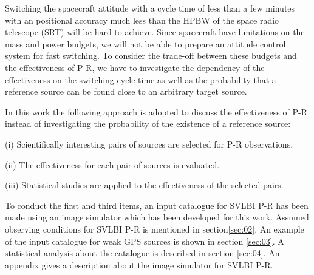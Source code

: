 Switching the spacecraft attitude with a cycle time of less 
than a few minutes with an positional accuracy much less than 
the HPBW of the space radio telescope (SRT) will be hard to 
achieve. Since spacecraft have limitations on the mass and 
power budgets, we will not be able to prepare 
an attitude control system for fast switching. To consider 
the trade-off between these budgets and 
the effectiveness of P-R, we have to investigate the 
dependency of the effectiveness on the switching cycle time 
as well as the probability that a reference source can 
be found close to an arbitrary target source.  

In this work the following approach is adopted to discuss 
the effectiveness of P-R instead of investigating the 
probability of the existence of a reference source: 
    \begin{list}{}
    {
        \setlength{\itemindent}{-6mm}
        \setlength{\parsep}{0mm}
        \setlength{\topsep}{3mm}
    }
    \item{(i)}
       Scientifically interesting pairs of sources are 
       selected for P-R observations. 
    \item{(ii)}
       The effectiveness for each pair of sources is evaluated. 
    \item{(iii)}
       Statistical studies are applied to the effectiveness of 
       the selected pairs. 
    \end{list}
To conduct the first and third items, an input catalogue for 
SVLBI P-R has been made using an image simulator which has been 
developed for this work. Assumed observing conditions for SVLBI 
P-R is mentioned in section\ref{sec:02}. An example of the 
input catalogue for weak GPS sources is shown in section \ref{sec:03}. 
A statistical analysis about the catalogue is described in 
section \ref{sec:04}. An appendix gives a description about the 
image simulator for SVLBI P-R. 


